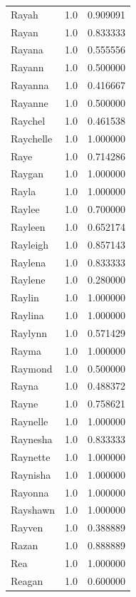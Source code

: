 \documentclass[
  letterpaper,
  DIV=11,
  numbers=noendperiod]{scrreprt}
\begin{document}
\begin{tabular}{lrr}
Rayah           &   1.0 &   0.909091 \\
Rayan           &   1.0 &   0.833333 \\
Rayana          &   1.0 &   0.555556 \\
Rayann          &   1.0 &   0.500000 \\
Rayanna         &   1.0 &   0.416667 \\
Rayanne         &   1.0 &   0.500000 \\
Raychel         &   1.0 &   0.461538 \\
Raychelle       &   1.0 &   1.000000 \\
Raye            &   1.0 &   0.714286 \\
Raygan          &   1.0 &   1.000000 \\
Rayla           &   1.0 &   1.000000 \\
Raylee          &   1.0 &   0.700000 \\
Rayleen         &   1.0 &   0.652174 \\
Rayleigh        &   1.0 &   0.857143 \\
Raylena         &   1.0 &   0.833333 \\
Raylene         &   1.0 &   0.280000 \\
Raylin          &   1.0 &   1.000000 \\
Raylina         &   1.0 &   1.000000 \\
Raylynn         &   1.0 &   0.571429 \\
Rayma           &   1.0 &   1.000000 \\
Raymond         &   1.0 &   0.500000 \\
Rayna           &   1.0 &   0.488372 \\
Rayne           &   1.0 &   0.758621 \\
Raynelle        &   1.0 &   1.000000 \\
Raynesha        &   1.0 &   0.833333 \\
Raynette        &   1.0 &   1.000000 \\
Raynisha        &   1.0 &   1.000000 \\
Rayonna         &   1.0 &   1.000000 \\
Rayshawn        &   1.0 &   1.000000 \\
Rayven          &   1.0 &   0.388889 \\
Razan           &   1.0 &   0.888889 \\
Rea             &   1.0 &   1.000000 \\
Reagan          &   1.0 &   0.600000 \\

\end{tabular}
\end{document}
